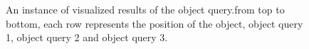 \begin{figure}[h!]

	
	\caption[An instance of Visualized results of the object query]{An instance of visualized results of the object query.from top to bottom, each row represents the position of the object, object query 1, object query 2 and object query 3.}
	\label{fig:street}
\end{figure}

